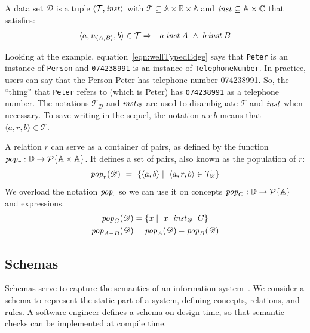 \documentclass[runningheads]{llncs}
\newcommand{\id}[1]{\text{\it #1\/}}
\newcommand{\popF}[1]{\id{pop}_{#1}}
\newcommand{\pop}[2]{\popF{#1}(#2)}
\newcommand{\instance}{\mathbin{\id{inst}}}
\newcommand{\powerset}[1]{\cal{P}\{#1\}}
\newcommand{\declare}[3]{\id{#1}_{\pair{#2}{#3}}}
\newcommand{\pair}[2]{\langle{#1},{#2}\rangle}
\newcommand{\Pair}[2]{#1\times#2}
\newcommand{\triple}[3]{\langle{#1},{#2},{#3}\rangle}
\newcommand{\atom}[1]{{\tt\small #1}}
\newcommand{\Atoms}{\mathbb{A}}
\newcommand{\Concepts}{\mathbb{C}}
\newcommand{\Rels}{\mathbb{R}}   %
\newcommand{\triples}{\mathcal{T}}
\newcommand{\Triple}[3]{#1\times#2\times#3}
\newcommand{\dataset}{\mathscr{D}}
\newcommand{\Dataset}{\mathbb{D}}
\begin{document}
   \begin{definition}
   A data set $\dataset$ is a tuple $\pair{\triples}{\instance}$ with $\triples \subseteq {\Triple{\Atoms}{\Rels}{\Atoms}}$ and $\instance \subseteq  {\Pair{\Atoms}{\Concepts}}$ that satisfies:
\begin{eqnarray}
   \triple{a}{\declare{n}{A}{B}}{b}\in\triples&\Rightarrow&a\instance A\ \wedge\ b\instance B
   \label{eqn:wellTypedEdge}
\end{eqnarray}
\end{definition}
   Looking at the example,
   equation~\ref{eqn:wellTypedEdge} says that \atom{Peter} is an instance of {\tt Person} and \atom{074238991} is an instance of {\tt TelephoneNumber}.
   In practice, users can say that the Person Peter has telephone number 074238991.
   So, the ``thing'' that \atom{Peter} refers to (which is Peter) has \atom{074238991} as a telephone number.
   The notations $\triples_{\dataset}$ and $\instance_{\dataset}$ are used to disambiguate $\triples$ and $\instance$ when necessary.
   To save writing in the sequel, the notation $a\ r\ b$ means that $\triple{a}{r}{b}\in\triples$.

   A relation $r$ can serve as a container of pairs,
   as defined by the function $\popF{r}:\Dataset\rightarrow\powerset{\Pair{\Atoms}{\Atoms}}$.
   It defines a set of pairs, also known as the population of $r$:
\begin{equation}
   \pop{r}{\dataset}\ =\ \{ \pair{a}{b}\mid\ \triple{a}{r}{b}\in\triples_{\dataset}\}
\label{eqn:pop-rel}
\end{equation}
%
   We overload the notation $\popF{\cdot}$ so we can use it on concepts $\popF{C}:\Dataset\rightarrow\powerset{\Atoms}$
   and expressions.
\begin{align}
   \pop{C}{\dataset}&= \{ x\mid\ x\ \instance_{\dataset}\ C\}
\label{eqn:pop-concept}\\
   \pop{A - B}{\dataset}&= \pop{A}{\dataset} - \pop{B}{\dataset}
\label{eqn:pop-expr}
\end{align}

\subsection{Schemas}
\label{sct:Schemas}
   Schemas serve to capture the semantics of an information system~\cite{Spivak2012}.
   We consider a schema to represent the static part of a system, defining concepts, relations, and rules.
   A software engineer defines a schema on design time, so that semantic checks can be implemented at compile time.
\end{document}
